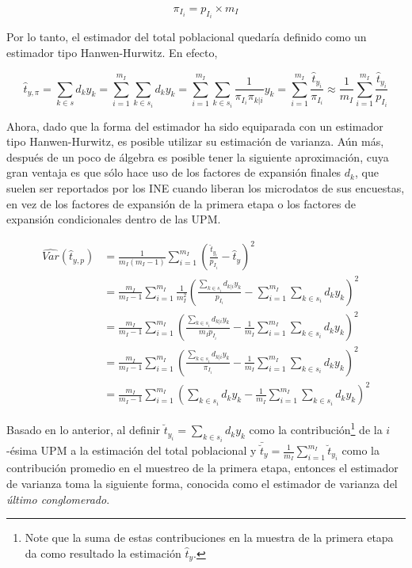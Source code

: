 \documentclass[
  12pt,
  spanish,
]{book}
\begin{document}
\[
\pi_{I_i} = p_{I_i} \times m_I 
\]

Por lo tanto, el estimador del total poblacional quedaría definido como un estimador tipo Hanwen-Hurwitz. En efecto,

\[
\hat{t}_{y,\pi} =\sum_{k\in s} d_k y_k  
= \sum_{i=1}^{m_I}\sum_{k \in s_i} d_k y_k 
= \sum_{i=1}^{m_I}\sum_{k \in s_i} \frac{1}{\pi_{I_i} \pi_{k|i}} y_k 
= \sum_{i=1}^{m_I}\frac{\hat{t}_{y_i}}{\pi_{I_i}} 
\approx \frac{1}{m_I}\sum_{i=1}^{m_I}\frac{\hat{t}_{y_i}}{p_{I_i}}
\]

Ahora, dado que la forma del estimador ha sido equiparada con un estimador tipo Hanwen-Hurwitz, es posible utilizar su estimación de varianza. Aún más, después de un poco de álgebra es posible tener la siguiente aproximación, cuya gran ventaja es que sólo hace uso de los factores de expansión finales \(d_k\), que suelen ser reportados por los INE cuando liberan los microdatos de sus encuestas, en vez de los factores de expansión de la primera etapa o los factores de expansión condicionales dentro de las UPM.

\begin{align*}
\widehat{Var}(\hat{t}_{y,p})&=\frac{1}{m_I(m_I-1)}\sum_{i=1}^{m_I}\left(\frac{\hat{t}_{y_i}}{p_{I_i}}-\hat{t}_{y}\right)^2\\
&=\frac{m_I}{m_I-1}\sum_{i=1}^{m_I}\frac{1}{m_I^2}\left(\frac{\sum_{k \in s_i} d_{k|i} y_k }{p_{I_i}}-\sum_{i=1}^{m_I}\sum_{k \in s_i} d_k y_k \right)^2 \\
&=\frac{m_I}{m_I-1}\sum_{i=1}^{m_I}\left(\frac{\sum_{k \in s_i} d_{k|i} y_k }{m_I p_{I_i}}-\frac{1}{m_I}\sum_{i=1}^{m_I}\sum_{k \in s_i} d_k y_k \right)^2 \\
&=\frac{m_I}{m_I-1}\sum_{i=1}^{m_I}\left(\frac{\sum_{k \in s_i} d_{k|i} y_k }{\pi_{I_i}}-\frac{1}{m_I}\sum_{i=1}^{m_I}\sum_{k \in s_i} d_k y_k \right)^2 \\
&=\frac{m_I}{m_I-1}\sum_{i=1}^{m_I}\left( \sum_{k \in s_i} d_k y_k -\frac{1}{m_I}\sum_{i=1}^{m_I}\sum_{k \in s_i} d_k y_k \right)^2 
\end{align*}

Basado en lo anterior, al definir \(\breve{t}_{y_i} = \sum_{k \in s_i} d_k y_k\) como la contribución\footnote{Note que la suma de estas contribuciones en la muestra de la primera etapa da como resultado la estimación \(\hat{t}_y\).} de la \(i\)-ésima UPM a la estimación del total poblacional y \(\bar{\breve{t}}_{y}=\frac{1}{m_I}\sum_{i=1}^{m_I}\breve{t}_{y_i}\) como la contribución promedio en el muestreo de la primera etapa, entonces el estimador de varianza toma la siguiente forma, conocida como el estimador de varianza del \emph{último conglomerado}.
\end{document}
